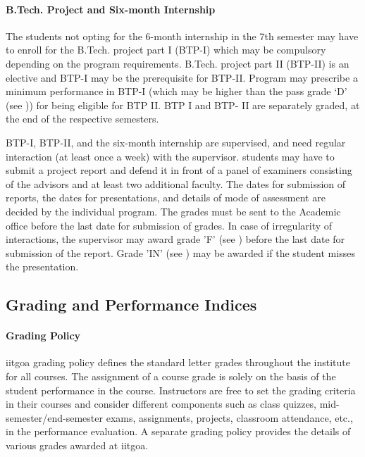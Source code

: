 \paragraph{B.Tech. Project and Six-month Internship} The \glspl{student} not opting for the 6-month internship in the 7th semester may have to enroll for the B.Tech. project part I (BTP-I) which may be compulsory depending on the program requirements. B.Tech. project part II (BTP-II) is an elective and BTP-I may be the prerequisite for BTP-II. Program may prescribe a minimum performance in BTP-I (which may be higher than the pass grade ‘D’ (see )) for being eligible for BTP II. BTP I and BTP- II are separately graded, at the end of the respective semesters.

BTP-I, BTP-II, and the six-month internship are supervised, and need regular interaction (at least once a week) with the supervisor. \Glspl{student} may have to submit a project report and defend it in front of a panel of examiners consisting of the advisors and at least two additional faculty. The dates for submission of reports, the dates for presentations, and details of mode of assessment are decided by the individual \gls{program}. The grades must be sent to the Academic office before the last date for submission of grades. In case of irregularity of interactions, the supervisor may award grade 'F' (see ) before the last date for submission of the report. Grade 'IN' (see ) may be awarded if the \gls{student} misses the presentation.

\subsection{Grading and Performance Indices \label{lab:CPI and SPI}}

\paragraph{Grading Policy \label{lab:Grading Policy}} \acrshort{iitgoa} grading policy defines the standard letter grades throughout the \gls{institute} for all courses. The assignment of a course grade is solely on the basis of the \gls{student} performance in the course. Instructors are free to set the grading criteria in their courses and consider different components such as class quizzes, mid-semester/end-semester exams, assignments, projects, classroom attendance, etc., in the performance evaluation.  A separate grading policy provides the details of various grades awarded at \acrshort{iitgoa}.

